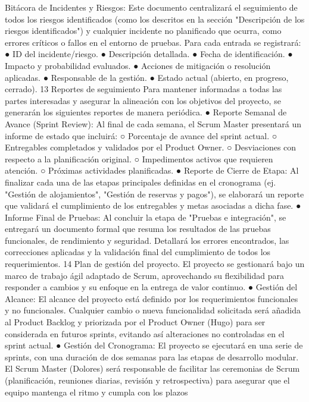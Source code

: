 Bitácora de Incidentes y Riesgos: Este documento centralizará el seguimiento de
todos los riesgos identificados (como los descritos en la sección "Descripción de
los riesgos identificados") y cualquier incidente no planificado que ocurra, como
errores críticos o fallos en el entorno de pruebas. Para cada entrada se registrará:
● ID del incidente/riesgo.
● Descripción detallada.
● Fecha de identificación.
● Impacto y probabilidad evaluados.
● Acciones de mitigación o resolución aplicadas.
● Responsable de la gestión.
● Estado actual (abierto, en progreso, cerrado).
13
Reportes de seguimiento
Para mantener informadas a todas las partes interesadas y asegurar la alineación
con los objetivos del proyecto, se generarán los siguientes reportes de manera
periódica.
● Reporte Semanal de Avance (Sprint Review): Al final de cada semana, el
Scrum Master presentará un informe de estado que incluirá:
○ Porcentaje de avance del sprint actual.
○ Entregables completados y validados por el Product Owner.
○ Desviaciones con respecto a la planificación original.
○ Impedimentos activos que requieren atención.
○ Próximas actividades planificadas.
● Reporte de Cierre de Etapa: Al finalizar cada una de las etapas principales
definidas en el cronograma (ej. "Gestión de alojamientos", "Gestión de
reservas y pagos"), se elaborará un reporte que validará el cumplimiento de
los entregables y metas asociadas a dicha fase.
● Informe Final de Pruebas: Al concluir la etapa de "Pruebas e integración",
se entregará un documento formal que resuma los resultados de las
pruebas funcionales, de rendimiento y seguridad. Detallará los errores
encontrados, las correcciones aplicadas y la validación final del
cumplimiento de todos los requerimientos.
14
Plan de gestión del proyecto.
El proyecto se gestionará bajo un marco de trabajo ágil adaptado de Scrum,
aprovechando su flexibilidad para responder a cambios y su enfoque en la entrega
de valor continuo.
● Gestión del Alcance: El alcance del proyecto está definido por los
requerimientos funcionales y no funcionales. Cualquier cambio o nueva
funcionalidad solicitada será añadida al Product Backlog y priorizada por el
Product Owner (Hugo) para ser considerada en futuros sprints, evitando
así alteraciones no controladas en el sprint actual.
● Gestión del Cronograma: El proyecto se ejecutará en una serie de sprints,
con una duración de dos semanas para las etapas de desarrollo modular. El
Scrum Master (Dolores) será responsable de facilitar las ceremonias de
Scrum (planificación, reuniones diarias, revisión y retrospectiva) para
asegurar que el equipo mantenga el ritmo y cumpla con los plazos
